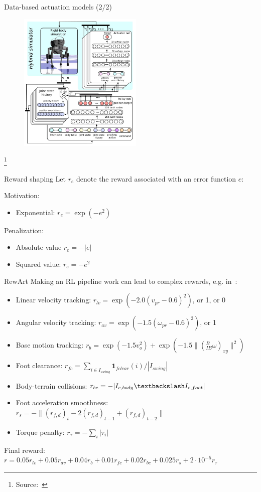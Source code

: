 \documentclass[10pt, aspectratio=1610]{beamer}
\newcommand\blfootnote[1]{%
  \begingroup
  \renewcommand\thefootnote{}%
  \footnote{#1}%
  \addtocounter{footnote}{-1}%
  \endgroup
}
\begin{document}
\begin{frame}{Data-based actuation models (2/2)}
    \begin{figure}
        \includegraphics[height=6.7cm]{figures/quadruped-training.png}
    \end{figure}
    \vspace{-0.7cm}
    \blfootnote{
        Source:~\cite{hwangbo2019}
    }
\end{frame}

\begin{frame}{Reward shaping}
    Let $r_e$ denote the reward associated with an error function $e$:

    Motivation:
    \begin{itemize}
        \item Exponential: $r_e = \exp(-e^2)$
    \end{itemize}

    Penalization:
    \begin{itemize}
        \item Absolute value $r_e = -|e|$
        \item Squared value: $r_e = -e^2$
    \end{itemize}
\end{frame}

\begin{frame}{RewArt}
    Making an RL pipeline work can lead to complex rewards, e.g. in~\cite{lee2020}:
    \begin{itemize}
        \item Linear velocity tracking: $r_{lv} = \exp(-2.0 (v_{pr} - 0.6)^2)$, or 1, or 0
        \item Angular velocity tracking: $r_{av} = \exp(-1.5 (\omega_{pr} - 0.6)^2)$, or 1
        \item Base motion tracking: $r_b = \exp(-1.5v_o^2) + \exp(-1.5 \|({}^B_{IB} \omega)_{xy}\|^2)$
        \item Foot clearance: $r_{fc} = \sum_{i \in I_{swing}} \mathbf{1}_{fclear}(i) / |I_{swing}|$
        \item Body-terrain collisions: $r_{bc} = -|I_{c,body} \textbackslash I_{c,foot}|$
        \item Foot acceleration smoothness: $r_{s} = -\| (r_{f,d})_t - 2(r_{f,d})_{t-1} + (r_{f,d})_{t-2}\|$
        \item Torque penalty: $r_{\tau} = -\sum_{i} | \tau_i |$
    \end{itemize}
    Final reward: $r = 0.05 r_{lv} + 0.05 r_{av} + 0.04 r_b + 0.01 r_{fc} + 0.02 r_{bc} + 0.025 r_s + 2 \cdot 10^{-5} r_{\tau}$
\end{frame}
\end{document}

